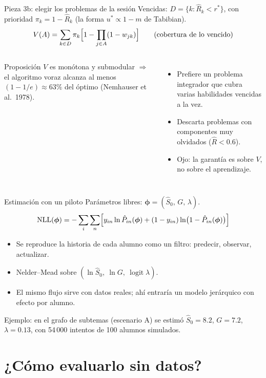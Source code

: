 \documentclass[aspectratio=169,11pt]{beamer}
\newcommand{\Rh}{\hat R}
\newcommand{\Sh}{\hat S}
\newcommand{\rstar}{r^{\ast}}
\begin{document}
\begin{frame}{Pieza 3b: elegir los problemas de la sesión}
\small
Vencidas: $D=\{k:\Rh_k<\rstar\}$, con prioridad $\pi_k=1-\Rh_k$ (la forma $u^\ast\propto1-m$ de Tabibian).
\[
V(A)=\sum_{k\in D}\pi_k\Bigl[1-\prod_{j\in A}(1-w_{jk})\Bigr]
\qquad\text{(cobertura de lo vencido)}
\]
\begin{columns}[T]
\begin{block}{Proposición}
$V$ es monótona y submodular $\Rightarrow$ el algoritmo voraz alcanza al menos $(1-1/e)\approx63\%$ del óptimo (Nemhauser et al.\ 1978).
\end{block}
\small
\begin{itemize}
\item Prefiere un problema integrador que cubra varias habilidades vencidas a la vez.
\item Descarta problemas con componentes muy olvidados ($\Rh<0.6$).
\item \alert{Ojo}: la garantía es sobre $V$, no sobre el aprendizaje.
\end{itemize}
\end{columns}
\end{frame}

\begin{frame}{Estimación con un piloto}
Parámetros libres: $\bm\phi=(\Sh_0,\,G,\,\lambda)$.
\[
\operatorname{NLL}(\bm\phi)=-\sum_i\sum_n\Bigl[y_{in}\ln\hat P_{in}(\bm\phi)+(1-y_{in})\ln\bigl(1-\hat P_{in}(\bm\phi)\bigr)\Bigr]
\]
\begin{itemize}
\item Se reproduce la historia de cada alumno como un \alert{filtro}: predecir, observar, actualizar.
\item Nelder--Mead sobre $(\ln\Sh_0,\ \ln G,\ \operatorname{logit}\lambda)$.
\item El mismo flujo sirve con datos reales; ahí entraría un modelo jerárquico con efecto por alumno.
\end{itemize}
\vspace{2mm}
{\small\color{gris} Ejemplo: en el grafo de subtemas (escenario A) se estimó $\Sh_0=8.2$, $G=7.2$, $\lambda=0.13$, con 54\,000 intentos de 100 alumnos simulados.}
\end{frame}

\section{¿Cómo evaluarlo sin datos?}
\end{document}
